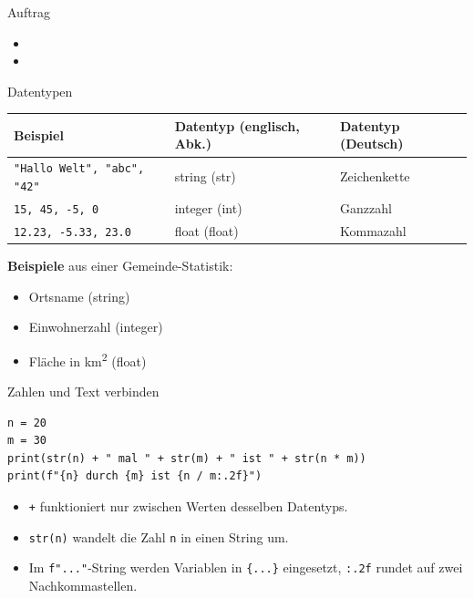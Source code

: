 \begin{frame}{Auftrag}
    \begin{itemize}
        \item {}
        \item {}
    \end{itemize}
\end{frame}

\begin{frame}[fragile]{Datentypen}
    \begin{table}[H]
        \footnotesize
        \centering
        \begin{tabular}{lp{2cm}p{2cm}}
            \textbf{Beispiel}                                        & \textbf{Datentyp (englisch, Abk.)} & \textbf{Datentyp (Deutsch)} \\\midrule
            \lstinline|"Hallo Welt", "abc", "42"| & string (str)                       & Zeichenkette                \\\midrule
            \lstinline|15, 45, -5, 0|             & integer (int)                      & Ganzzahl                    \\\midrule
            \lstinline|12.23, -5.33, 23.0|        & float (float)                      & Kommazahl
        \end{tabular}
    \end{table}

    \textbf{Beispiele} aus einer Gemeinde-Statistik:
    \begin{itemize}
        \item Ortsname (string)
        \item Einwohnerzahl (integer)
        \item Fläche in km\textsuperscript{2} (float)
    \end{itemize}
\end{frame}

\begin{frame}[fragile]{Zahlen und Text verbinden}
    \begin{lstlisting}
n = 20
m = 30
print(str(n) + " mal " + str(m) + " ist " + str(n * m))
print(f"{n} durch {m} ist {n / m:.2f}")
\end{lstlisting}
    \begin{itemize}
        \item \lstinline|+| funktioniert nur zwischen Werten desselben Datentyps.
        \item \lstinline|str(n)| wandelt die Zahl \lstinline|n| in einen String um.
        \item Im \lstinline|f"..."|-String werden Variablen in \lstinline|{...}| eingesetzt, \lstinline|:.2f| rundet auf zwei Nachkommastellen.
    \end{itemize}
\end{frame}


